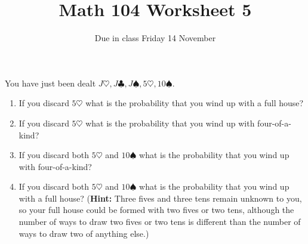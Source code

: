 \documentclass[12pt]{article}
\author{}\date{Due in class Friday 14 November}
\title{Math 104 Worksheet 5}\author{}
\begin{document}
\maketitle
\pagestyle{empty}
You have just been dealt
$J\heartsuit,J\clubsuit,J\spadesuit,5\heartsuit,10\spadesuit$.
\begin{enumerate}
\item If you discard $5\heartsuit$ what is the probability
that you wind up with a full house?
\item If you discard $5\heartsuit$ what is the probability
that you wind up with four-of-a-kind?
\item If you discard both $5\heartsuit$ and $10\spadesuit$
what is the probability that you wind up with four-of-a-kind?
\item If you discard both $5\heartsuit$ and $10\spadesuit$
what is the probability that you wind up with a full house?
({\bf Hint:} Three fives and three
tens remain unknown to you, so your full house could be formed
with two fives or two tens, although the number of ways
to draw two fives or two tens is different than the number
of ways to draw two of anything else.)
\end{enumerate}
\end{document}
